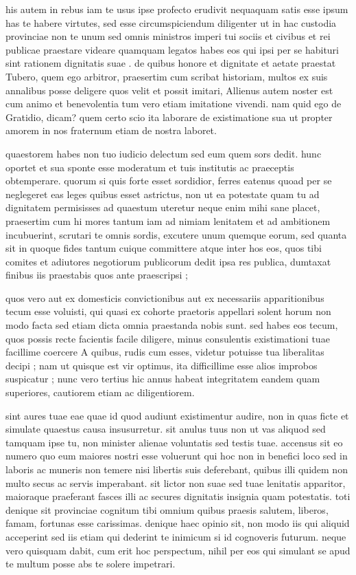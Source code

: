  his autem in rebus iam te usus ipse profecto erudivit nequaquam satis esse ipsum has te habere virtutes, sed esse circumspiciendum diligenter ut in hac custodia provinciae non te unum sed omnis ministros imperi tui sociis et civibus et rei publicae praestare videare quamquam legatos habes eos qui ipsi per se habituri sint rationem dignitatis suae . de quibus honore et dignitate et aetate praestat Tubero, quem ego arbitror, praesertim cum scribat historiam, multos ex suis annalibus posse deligere quos velit et possit imitari, Allienus autem noster est cum animo et benevolentia tum vero etiam imitatione vivendi. nam quid ego de Gratidio, dicam? quem certo scio ita laborare de existimatione sua ut propter amorem in nos fraternum etiam de nostra laboret.

 quaestorem habes non tuo iudicio delectum sed eum quem sors dedit. hunc oportet et sua sponte esse moderatum et tuis institutis ac praeceptis obtemperare. quorum si quis forte esset sordidior, ferres eatenus quoad per se neglegeret eas leges quibus esset astrictus, non ut ea potestate quam tu ad dignitatem permisisses ad quaestum uteretur neque enim mihi sane placet, praesertim cum hi mores tantum iam ad nimiam lenitatem et ad ambitionem incubuerint, scrutari te omnis sordis, excutere unum quemque eorum, sed quanta sit in quoque fides tantum cuique committere atque inter hos eos, quos tibi comites et adiutores negotiorum publicorum dedit ipsa res publica, dumtaxat finibus iis praestabis quos ante praescripsi ;

 quos vero aut ex domesticis convictionibus aut ex necessariis apparitionibus tecum esse voluisti, qui quasi ex cohorte praetoris appellari solent horum non modo facta sed etiam dicta omnia praestanda nobis sunt. sed habes eos tecum, quos possis recte facientis facile diligere, minus consulentis existimationi tuae facillime coercere A quibus, rudis cum esses, videtur potuisse tua liberalitas decipi ; nam ut quisque est vir optimus, ita difficillime esse alios improbos suspicatur ; nunc vero tertius hic annus habeat integritatem eandem quam superiores, cautiorem etiam ac diligentiorem.

 sint aures tuae eae quae id quod audiunt existimentur audire, non in quas ficte et simulate quaestus causa insusurretur. sit anulus tuus non ut vas aliquod sed tamquam ipse tu, non minister alienae voluntatis sed testis tuae. accensus sit eo numero quo eum maiores nostri esse voluerunt qui hoc non in benefici loco sed in laboris ac muneris non temere nisi libertis suis deferebant, quibus illi quidem non multo secus ac servis imperabant. sit lictor non suae sed tuae lenitatis apparitor, maioraque praeferant fasces illi ac secures dignitatis insignia quam potestatis. toti denique sit provinciae cognitum tibi omnium quibus praesis salutem, liberos, famam, fortunas esse carissimas. denique haec opinio sit, non modo iis qui aliquid acceperint sed iis etiam qui dederint te inimicum si id cognoveris futurum. neque vero quisquam dabit, cum erit hoc perspectum, nihil per eos qui simulant se apud te multum posse abs te solere impetrari.

